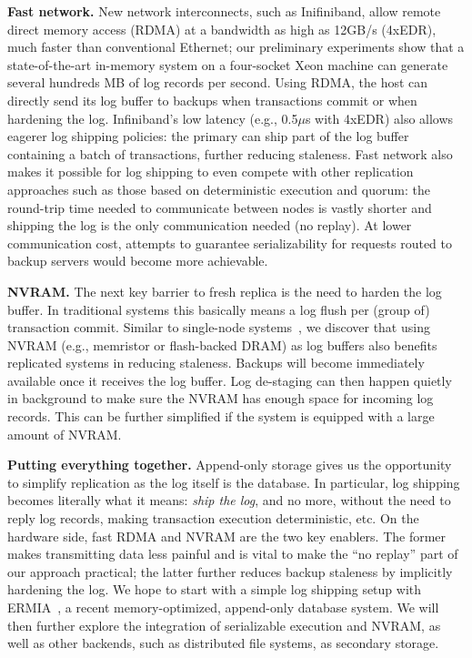 \documentclass[10pt]{article}
\begin{document}
\textbf{Fast network.} New network interconnects, such as Inifiniband, allow remote direct memory access (RDMA) at a bandwidth as high as 12GB/s (4xEDR), much faster than conventional Ethernet; our preliminary experiments show that a state-of-the-art in-memory system on a four-socket Xeon machine can generate several hundreds MB of log records per second. Using RDMA, the host can directly send its log buffer to backups when transactions commit or when hardening the log. Infiniband's low latency (e.g., 0.5$\mu$s with 4xEDR) also allows eagerer log shipping policies: the primary can ship part of the log buffer containing a batch of transactions, further reducing staleness. Fast network also makes it possible for log shipping to even compete with other replication approaches such as those based on deterministic execution and quorum: the round-trip time needed to communicate between nodes is vastly shorter and shipping the log is the only communication needed (no replay). At lower communication cost, attempts to guarantee serializability for requests routed to backup servers would become more achievable.

\textbf{NVRAM.} The next key barrier to fresh replica is the need to harden the log buffer. In traditional systems this basically means a log flush per (group of) transaction commit. Similar to single-node systems~\cite{NVM-DLog}, we discover that using NVRAM (e.g., memristor or flash-backed DRAM) as log buffers also benefits replicated systems in reducing staleness. Backups will become immediately available once it receives the log buffer. Log de-staging can then happen quietly in background to make sure the NVRAM has enough space for incoming log records. This can be further simplified if the system is equipped with a large amount of NVRAM.

\textbf{Putting everything together.} Append-only storage gives us the opportunity to simplify replication as the log itself is the database. In particular, log shipping becomes literally what it means: \textit{ship the log}, and no more, without the need to reply log records, making transaction execution deterministic, etc. On the hardware side, fast RDMA and NVRAM are the two key enablers. The former makes transmitting data less painful and is vital to make the ``no replay'' part of our approach practical; the latter further reduces backup staleness by implicitly hardening the log. We hope to start with a simple log shipping setup with ERMIA~\cite{ERMIA}, a recent memory-optimized, append-only database system. We will then further explore the integration of serializable execution and NVRAM, as well as other backends, such as distributed file systems, as secondary storage.
\renewcommand{\refname}{}\vspace{-12mm}

\setlength{\bibsep}{3pt plus 0ex}

\end{document}
